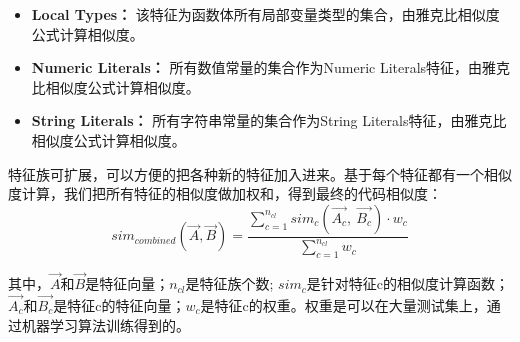 \begin{itemize}
	
	\item \textbf{Local Types：} 该特征为函数体所有局部变量类型的集合，由雅克比相似度公式计算相似度。
	\item \textbf{Numeric Literals：} 所有数值常量的集合作为Numeric Literals特征，由雅克比相似度公式计算相似度。
	\item \textbf{String Literals：} 所有字符串常量的集合作为String Literals特征，由雅克比相似度公式计算相似度。
\end{itemize}

特征族可扩展，可以方便的把各种新的特征加入进来。基于每个特征都有一个相似度计算，我们把所有特征的相似度做加权和，得到最终的代码相似度：
\begin{equation}
	sim_{combined}(\vec{A},\vec{B})=\frac{\sum_{c=1}^{n_{cl}}sim_{c}(\vec{A_c},~\vec{B_c})\cdot w_{c}}{\sum_{c=1}^{n_{cl}}w_{c}}
\end{equation}

其中，$\vec{A}$和$\vec{B}$是特征向量；$n_{cl}$是特征族个数; $sim_{c}$是针对特征c的相似度计算函数；$\vec{A_c}$和$\vec{B_c}$是特征c的特征向量；$w_{c}$是特征c的权重。权重是可以在大量测试集上，通过机器学习算法训练得到的。
